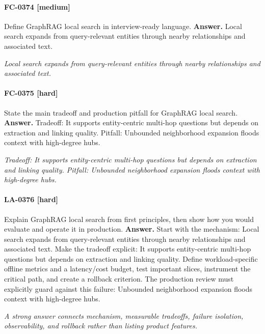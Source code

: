 \paragraph{FC-0374 [medium]} Define GraphRAG local search in interview-ready language.
\noindent\textbf{Answer.} Local search expands from query-relevant entities through nearby relationships and associated text.
\par\textit{Local search expands from query-relevant entities through nearby relationships and associated text.}
\paragraph{FC-0375 [hard]} State the main tradeoff and production pitfall for GraphRAG local search.
\noindent\textbf{Answer.} Tradeoff: It supports entity-centric multi-hop questions but depends on extraction and linking quality. Pitfall: Unbounded neighborhood expansion floods context with high-degree hubs.
\par\textit{Tradeoff: It supports entity-centric multi-hop questions but depends on extraction and linking quality. Pitfall: Unbounded neighborhood expansion floods context with high-degree hubs.}
\paragraph{LA-0376 [hard]} Explain GraphRAG local search from first principles, then show how you would evaluate and operate it in production.
\noindent\textbf{Answer.} Start with the mechanism: Local search expands from query-relevant entities through nearby relationships and associated text. Make the tradeoff explicit: It supports entity-centric multi-hop questions but depends on extraction and linking quality. Define workload-specific offline metrics and a latency/cost budget, test important slices, instrument the critical path, and create a rollback criterion. The production review must explicitly guard against this failure: Unbounded neighborhood expansion floods context with high-degree hubs.
\par\textit{A strong answer connects mechanism, measurable tradeoffs, failure isolation, observability, and rollback rather than listing product features.}
